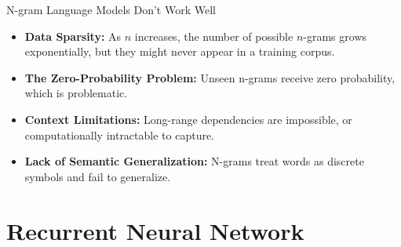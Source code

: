 \documentclass[aspectratio=169,xcolor=dvipsnames,svgnames,x11names,fleqn]{beamer}
\begin{document}
\begin{frame}{N-gram Language Models Don't Work Well}
    \vspace{5pt}
    
    \begin{itemize}
        \item \textbf{Data Sparsity:} 
        As $n$ increases, the number of possible $n$-grams grows exponentially, but they might never appear in a training corpus.
        
        \vspace{8pt}
        
        \item  \textbf{The Zero-Probability Problem:} 
        Unseen n-grams receive zero probability, which is problematic. 
        
        \vspace{8pt}
        
        \item  \textbf{Context Limitations:} 
        Long-range dependencies are impossible, or computationally intractable to capture.
        
        \vspace{8pt}
        
        \item 
         \textbf{Lack of Semantic Generalization:} 
        N-grams treat words as discrete symbols and fail to generalize.
    \end{itemize}

    \vfill

\end{frame}


\section{Recurrent Neural Network}

\begin{frame}
    \sectionpage
\end{frame}
\end{document}
